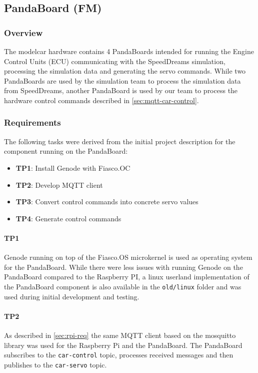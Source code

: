 \subsection{PandaBoard (FM)}
\label{sec:panda}

\subsubsection{Overview}
\label{sec:panda-overview}
The modelcar hardware contains 4 PandaBoards intended for running the Engine Control Units (ECU) communicating with the SpeedDreams simulation, processing the simulation data and generating the servo commands.
While two PandaBoards are used by the simulation team to process the simulation data from SpeedDreams, another PandaBoard is used by our team to process the hardware control commands described in \autoref{sec:mqtt-car-control}.


\subsubsection{Requirements}
\label{sec:panda-req}
The following tasks were derived from the initial project description for the component running on the PandaBoard:
\begin{itemize}
    \item \textbf{TP1}: Install Genode with Fiasco.OC
    \item \textbf{TP2}: Develop MQTT client
    \item \textbf{TP3}: Convert control commands into concrete servo values
    \item \textbf{TP4}: Generate control commands
\end{itemize}

\paragraph{\textbf{TP1}} Genode running on top of the Fiasco.OS microkernel is used as operating system for the PandaBoard.
While there were less issues with running Genode on the PandaBoard compared to the Raspberry PI, a linux userland implementation of the PandaBoard component is also available in the \texttt{old/linux} folder and was used during initial development and testing.

\paragraph{\textbf{TP2}} As described in \autoref{sec:rpi-req} the same MQTT client based on the mosquitto library was used for the Raspberry Pi and the PandaBoard.
The PandaBoard subscribes to the \texttt{car-control} topic, processes received messages and then publishes to the \texttt{car-servo} topic.

